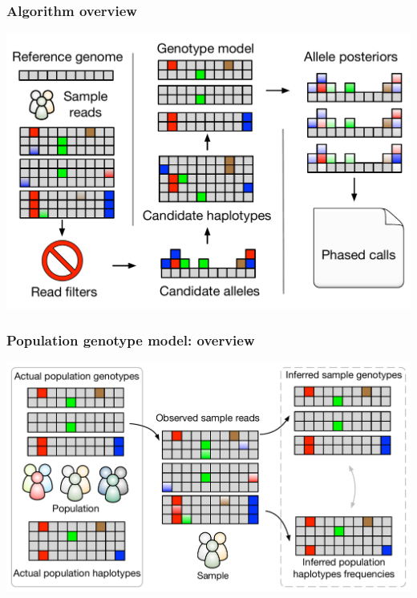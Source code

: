 \documentclass{beamer}
\begin{document}

\begin{frame}
\frametitle{Algorithm overview}
\begin{center}
    \includegraphics[width=0.95\linewidth]{images/octopus_workflow}
\end{center}
\end{frame}


\begin{frame}
\frametitle{Population genotype model: overview}

\includegraphics[width=\linewidth]{images/population_calling}

\end{frame}

\end{document}
